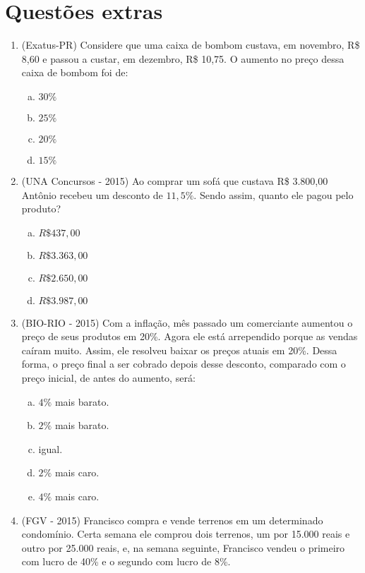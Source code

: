  \section{Questões extras}
\begin{enumerate}

   \item (Exatus-PR) Considere que uma caixa de bombom custava, em novembro, R\$ 8,60 e passou a custar, em dezembro, R\$ 10,75. O aumento no preço dessa caixa de bombom foi de:
  \begin{enumerate}[a)]
  \item $30\%$
  \item $25\%$
  \item $20\%$
  \item $15\%$
  \end{enumerate}

    \item (UNA Concursos - 2015) Ao comprar um sofá que custava R\$ 3.800,00 Antônio recebeu um desconto de $11,5\%$. Sendo assim, quanto ele pagou pelo produto?
   \begin{enumerate}[a)]
  \item $R\$ 437,00$
  \item $R\$ 3.363,00$
  \item $R\$ 2.650,00$
  \item $R\$ 3.987,00$
  \end{enumerate}

  \item (BIO-RIO - 2015) Com a inflação, mês passado um comerciante aumentou o preço de seus produtos em 20\%. Agora ele está arrependido porque as vendas caíram muito. Assim, ele resolveu baixar os preços atuais em 20\%. Dessa forma, o preço final a ser cobrado depois desse desconto, comparado com o preço inicial, de antes do aumento, será:
  \begin{enumerate}[a)]
  \item $4\%$ mais barato.
  \item $2\%$ mais barato.
  \item igual.
  \item $2\%$ mais caro.
  \item $4\%$ mais caro.
  \end{enumerate}

  \item (FGV - 2015) Francisco compra e vende terrenos em um determinado condomínio. Certa semana ele comprou dois terrenos, um por 15.000 reais e outro por 25.000 reais, e, na semana seguinte, Francisco vendeu o primeiro com lucro de 40\% e o segundo com lucro de 8\%.


\end{enumerate}
